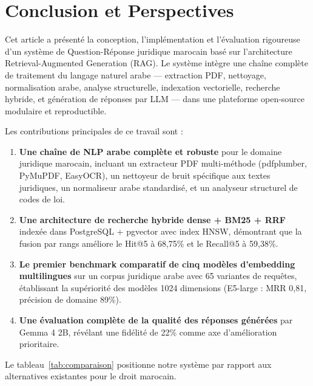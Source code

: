 \section{Conclusion et Perspectives}

\noindent Cet article a présenté la conception, l'implémentation et l'évaluation
rigoureuse d'un système de Question-Réponse juridique marocain basé sur
l'architecture Retrieval-Augmented Generation (RAG). Le système intègre une
chaîne complète de traitement du langage naturel arabe — extraction PDF,
nettoyage, normalisation arabe, analyse structurelle, indexation vectorielle,
recherche hybride, et génération de réponses par LLM — dans une plateforme
open-source modulaire et reproductible.

\vspace{0.2cm}

\noindent Les contributions principales de ce travail sont :

\begin{enumerate}
    \item \textbf{Une chaîne de NLP arabe complète et robuste} pour le
    domaine juridique marocain, incluant un extracteur PDF multi-méthode
    (pdfplumber, PyMuPDF, EasyOCR), un nettoyeur de bruit spécifique aux
    textes juridiques, un normaliseur arabe standardisé, et un analyseur
    structurel de codes de loi.
    \item \textbf{Une architecture de recherche hybride dense + BM25 + RRF}
    indexée dans PostgreSQL + pgvector avec index HNSW, démontrant que la
    fusion par rangs améliore le Hit@5 à 68,75\% et le Recall@5 à 59,38\%.
    \item \textbf{Le premier benchmark comparatif de cinq modèles d'embedding
    multilingues} sur un corpus juridique arabe avec 65 variantes de requêtes,
    établissant la supériorité des modèles 1024 dimensions (E5-large : MRR
    0,81, précision de domaine 89\%).
    \item \textbf{Une évaluation complète de la qualité des réponses générées}
    par Gemma 4 2B, révélant une fidélité de 22\% comme axe d'amélioration
    prioritaire.
\end{enumerate}

\vspace{0.2cm}

\noindent Le tableau~\ref{tab:comparaison} positionne notre système par rapport
aux alternatives existantes pour le droit marocain.

